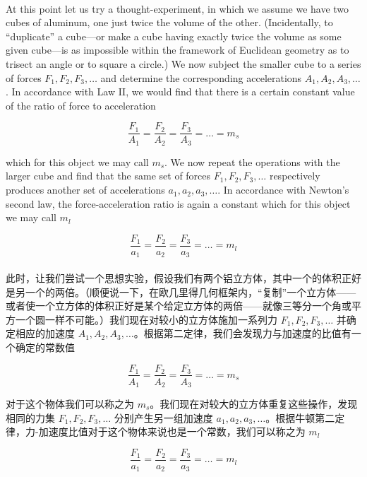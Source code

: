 \documentclass{article}
\begin{document}
\\
At this point let us try a thought-experiment, in which we assume we have two cubes of aluminum, one just twice the volume of the other. (Incidentally, to ``duplicate'' a cube—or make a cube having exactly twice the volume as some given cube—is as impossible within the framework of Euclidean geometry as to trisect an angle or to square a circle.) We now subject the smaller cube to a series of forces \( F_1, F_2, F_3, \ldots \) and determine the corresponding accelerations \( A_1, A_2, A_3, \ldots \). In accordance with Law II, we would find that there is a certain constant value of the ratio of force to acceleration

\[
\frac{F_1}{A_1} = \frac{F_2}{A_2} = \frac{F_3}{A_3} = \ldots = m_s
\]

\noindent which for this object we may call \( m_s \). We now repeat the operations with the larger cube and find that the same set of forces \( F_1, F_2, F_3, \ldots \) respectively produces another set of accelerations \( a_1, a_2, a_3, \ldots \). In accordance with Newton's second law, the force-acceleration ratio is again a constant which for this object we may call \( m_l \)

\[
\frac{F_1}{a_1} = \frac{F_2}{a_2} = \frac{F_3}{a_3} = \ldots = m_l
\]\\
\noindent 此时，让我们尝试一个思想实验，假设我们有两个铝立方体，其中一个的体积正好是另一个的两倍。（顺便说一下，在欧几里得几何框架内，“复制”一个立方体——或者使一个立方体的体积正好是某个给定立方体的两倍——就像三等分一个角或平方一个圆一样不可能。）我们现在对较小的立方体施加一系列力 \( F_1, F_2, F_3, \ldots \) 并确定相应的加速度 \( A_1, A_2, A_3, \ldots \)。根据第二定律，我们会发现力与加速度的比值有一个确定的常数值

\[
\frac{F_1}{A_1} = \frac{F_2}{A_2} = \frac{F_3}{A_3} = \ldots = m_s
\]

对于这个物体我们可以称之为 \( m_s \)。我们现在对较大的立方体重复这些操作，发现相同的力集 \( F_1, F_2, F_3, \ldots \) 分别产生另一组加速度 \( a_1, a_2, a_3, \ldots \)。根据牛顿第二定律，力-加速度比值对于这个物体来说也是一个常数，我们可以称之为 \( m_l \)

\[
\frac{F_1}{a_1} = \frac{F_2}{a_2} = \frac{F_3}{a_3} = \ldots = m_l
\]\\
\end{document}
